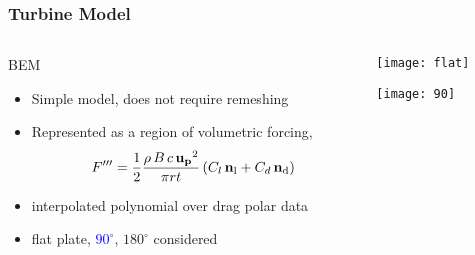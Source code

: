 \documentclass[mathserif]{beamer}
\begin{document}
%
%
%
\begin{frame}
  \frametitle{Turbine Model}
  
  \begin{columns}[]
    \begin{column}{0.6\linewidth}
      
      \begin{block}{BEM}
        \begin{itemize}
	\item Simple model, does not require remeshing
        \item Represented as a region of volumetric forcing,
          \begin{equation}
            F''' = \frac{1}{2}\frac{\rho\, B\, c\,
              {\bf u_p}^2}{\pi r t}\left(C_l \, {\bf n_\text{l}} + C_d \, {\bf
	      n_\text{d}} \right)
          \end{equation}
        \item interpolated polynomial over drag polar data
        \item flat plate, \textcolor{blue}{$90^{\circ}$}, $180^{\circ}$ considered
        \end{itemize}
      \end{block}
      
    \end{column}
    \begin{column}{0.4\linewidth}
      
      \begin{center}
        \texttt{[image: flat]}
      \end{center}

      \begin{center}
        \texttt{[image: 90]}
      \end{center}

      
    \end{column}
  \end{columns}
  
\end{frame}
\end{document}
